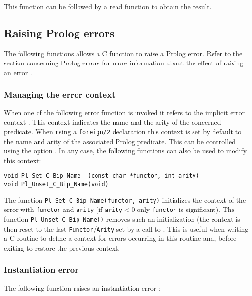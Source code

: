 This function can be followed by a read function 
to obtain the result.

\subsection{Raising Prolog errors}
\label{Raising-Prolog-errors}
The following functions allows a C function to raise a Prolog error. Refer
to the section concerning Prolog errors for more information about the
effect of raising an error .

\subsubsection{Managing the error context}
When one of the following error function is invoked it refers to the
implicit error context . This
context indicates the name and the arity of the concerned predicate. When
using a \texttt{foreign/2} declaration this context is set by default to the
name and arity of the associated Prolog predicate. This can be controlled
using the  option . In any
case, the following functions can also be used to modify this context:

\begin{Indentation}
\begin{verbatim}
void Pl_Set_C_Bip_Name  (const char *functor, int arity)
void Pl_Unset_C_Bip_Name(void)
\end{verbatim}
\end{Indentation}

The function \texttt{Pl\_Set\_C\_Bip\_Name(functor, arity)} initializes the
context of the error with \texttt{functor} and \texttt{arity} (if
\texttt{arity}$<$0 only \texttt{functor} is significant). The function
\texttt{Pl\_Unset\_C\_Bip\_Name()} removes such an initialization (the context
is then reset to the last \texttt{Functor}/\texttt{Arity} set by a call to
 . This is useful when
writing a C routine to define a context for errors occurring in this routine
and, before exiting to restore the previous context.

\subsubsection{Instantiation error}
The following function raises an instantiation error :

